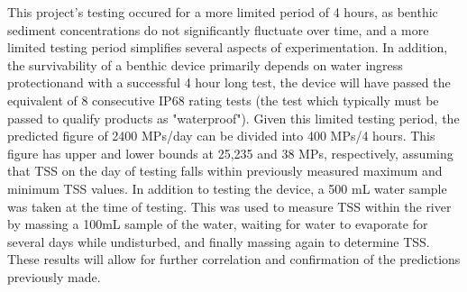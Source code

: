 \documentclass[fleqn,10pt]{SelfArx} %
\begin{document}
	This project's testing occured for a more limited period of 4 hours, as \gls{benthic} sediment concentrations do not significantly fluctuate over time, and a more limited testing period simplifies several aspects of experimentation. In addition, the survivability of a \gls{benthic} device primarily depends on water ingress protection\textemdash and with a successful 4 hour long test, the device will have passed the equivalent of 8 consecutive IP68 rating tests (the test which typically must be passed to qualify products as "waterproof"). Given this limited testing period, the predicted figure of 2400 MPs/day can be divided into 400 MPs/4 hours. This figure has upper and lower bounds at 25,235 and 38 MPs, respectively, assuming that TSS on the day of testing falls within previously measured maximum and minimum TSS values.
	\linebreak
	In addition to testing the device, a 500 mL water sample was taken at the time of testing. This was used to measure TSS within the river by massing a 100mL sample of the water, waiting for water to evaporate for several days while undisturbed, and finally massing again to determine TSS. These results will allow for further correlation and confirmation of the predictions previously made.
\end{document}
